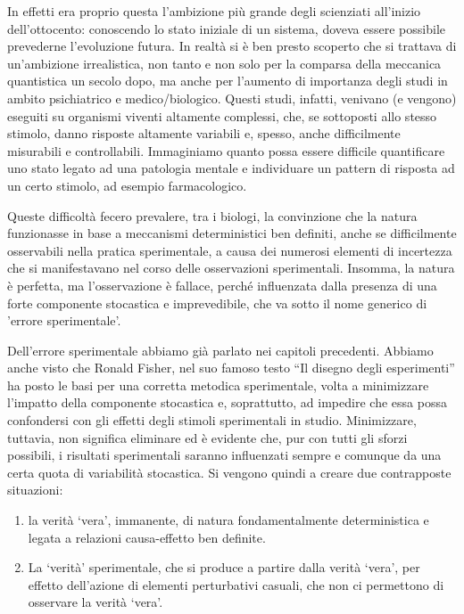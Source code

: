 \documentclass[a4paper,12pt,oneside]{book}
\providecommand{\tightlist}{%
  \setlength{\itemsep}{0pt}\setlength{\parskip}{0pt}}
\theoremstyle{definition}
\theoremstyle{definition}
\theoremstyle{definition}
\theoremstyle{remark}
\begin{document}
In effetti era proprio questa l'ambizione più grande degli scienziati
all'inizio dell'ottocento: conoscendo lo stato iniziale di un sistema,
doveva essere possibile prevederne l'evoluzione futura. In realtà si è
ben presto scoperto che si trattava di un'ambizione irrealistica, non
tanto e non solo per la comparsa della meccanica quantistica un secolo
dopo, ma anche per l'aumento di importanza degli studi in ambito
psichiatrico e medico/biologico. Questi studi, infatti, venivano (e
vengono) eseguiti su organismi viventi altamente complessi, che, se
sottoposti allo stesso stimolo, danno risposte altamente variabili e,
spesso, anche difficilmente misurabili e controllabili. Immaginiamo
quanto possa essere difficile quantificare uno stato legato ad una
patologia mentale e individuare un pattern di risposta ad un certo
stimolo, ad esempio farmacologico.

Queste difficoltà fecero prevalere, tra i biologi, la convinzione che la
natura funzionasse in base a meccanismi deterministici ben definiti,
anche se difficilmente osservabili nella pratica sperimentale, a causa
dei numerosi elementi di incertezza che si manifestavano nel corso delle
osservazioni sperimentali. Insomma, la natura è perfetta, ma
l'osservazione è fallace, perché influenzata dalla presenza di una forte
componente stocastica e imprevedibile, che va sotto il nome generico di
'errore sperimentale'.

Dell'errore sperimentale abbiamo già parlato nei capitoli precedenti.
Abbiamo anche visto che Ronald Fisher, nel suo famoso testo ``Il disegno
degli esperimenti'' ha posto le basi per una corretta metodica
sperimentale, volta a minimizzare l'impatto della componente stocastica
e, soprattutto, ad impedire che essa possa confondersi con gli effetti
degli stimoli sperimentali in studio. Minimizzare, tuttavia, non
significa eliminare ed è evidente che, pur con tutti gli sforzi
possibili, i risultati sperimentali saranno influenzati sempre e
comunque da una certa quota di variabilità stocastica. Si vengono quindi
a creare due contrapposte situazioni:

\begin{enumerate}
\def\labelenumi{\arabic{enumi}.}
\tightlist
\item
  la verità `vera', immanente, di natura fondamentalmente deterministica
  e legata a relazioni causa-effetto ben definite.
\item
  La `verità' sperimentale, che si produce a partire dalla verità
  `vera', per effetto dell'azione di elementi perturbativi casuali, che
  non ci permettono di osservare la verità `vera'.
\end{enumerate}
\end{document}
